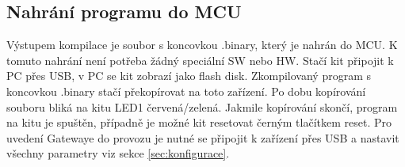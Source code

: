 \subsection{Nahrání programu do MCU}
Výstupem kompilace je soubor s koncovkou .binary, který je nahrán do MCU. K tomuto nahrání není potřeba žádný speciální SW nebo HW.
Stačí kit připojit k PC přes USB, v PC se kit zobrazí jako flash disk. Zkompilovaný program s koncovkou .binary stačí překopírovat na toto zařízení. 
Po dobu kopírování souboru bliká na kitu LED1 červená/zelená. Jakmile kopírování skončí, program na kitu je spuštěn, případně je možné kit resetovat černým tlačítkem reset.
Pro uvedení Gatewaye do provozu je nutné se připojit k zařízení přes USB a nastavit všechny parametry viz sekce \ref{sec:konfigurace}.  